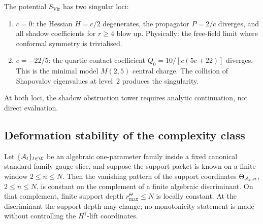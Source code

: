 \begin{remark}
The potential $S_{\mathrm{Vir}}$ has two singular loci:
\begin{enumerate}[label=\textup{(\alph*)}]
\item $c = 0$: the Hessian $H = c/2$ degenerates, the
 propagator $P = 2/c$ diverges, and all shadow coefficients
 for $r \geq 4$ blow up. Physically: the free-field
 limit where conformal symmetry is trivialised.
\item $c = -22/5$: the quartic contact coefficient
 $Q_0 = 10/[c(5c+22)]$ diverges. This is the minimal
 model $M(2,5)$ central charge. The collision of Shapovalov
 eigenvalues at level~$2$ produces the singularity.
\end{enumerate}
At both loci, the shadow obstruction tower requires analytic continuation,
not direct evaluation.
\end{remark}



\subsection{Deformation stability of the complexity class}

\begin{proposition}
\ClaimStatusProvedHere
{}
Let \(\{\cA_t\}_{t\in\C}\) be an algebraic one-parameter family
inside a fixed canonical standard-family gauge slice, and suppose
the support packet is known on a finite window \(2\le n\le N\).
Then the vanishing pattern of the support coordinates
\(\Theta_{\mathcal{A}_t,n}\), \(2\le n\le N\), is constant on the
complement of a finite algebraic discriminant. On that complement,
finite support depth \(r^\Theta_{\max}\le N\) is locally constant.
At the discriminant the support depth may change; no monotonicity
statement is made without controlling the \(H^1\)-lift coordinates.
\end{proposition}

